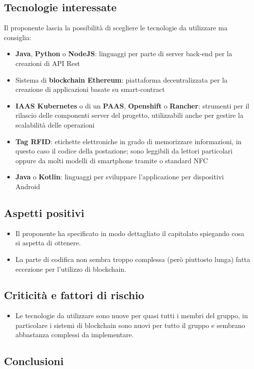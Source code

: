 \subsection{Tecnologie interessate}
Il proponente lascia la possibilità di scegliere le tecnologie da utilizzare ma consiglia:
\begin{itemize}
    \item \textbf{Java}, \textbf{Python} o \textbf{NodeJS}: linguaggi per parte di server back-end per la creazioni di API Rest
    \item Sistema di \textbf{blockchain Ethereum}: piattaforma decentralizzata per la creazione di applicazioni basate su smart-contract
    \item \textbf{IAAS Kubernetes} o di un \textbf{PAAS}, \textbf{Openshift} o \textbf{Rancher}: strumenti per il rilascio delle componenti server del progetto, utilizzabili anche per gestire la scalabilità delle operazioni
    \item \textbf{Tag RFID}: etichette elettroniche in grado di memorizzare informazioni, in questo caso il codice della postazione; sono leggibili da lettori particolari oppure da molti modelli di smartphone tramite o standard NFC
    \item \textbf{Java} o \textbf{Kotlin}: linguaggi per sviluppare l'applicazione per dispositivi Android
\end{itemize}
\subsection{Aspetti positivi}
\begin{itemize}
    \item Il proponente ha specificato in modo dettagliato il capitolato spiegando cosa si aspetta di ottenere.
    \item La parte di codifica non sembra troppo complessa (però piuttosto lunga) fatta eccezione per l'utilizzo di blockchain.
\end{itemize}
\subsection{Criticità e fattori di rischio}
\begin{itemize}
    \item Le tecnologie da utilizzare sono nuove per quasi tutti i membri del gruppo, in particolare i sistemi di blockchain sono nuovi per tutto il gruppo e sembrano abbastanza complessi da implementare.
\end{itemize}
\subsection{Conclusioni}